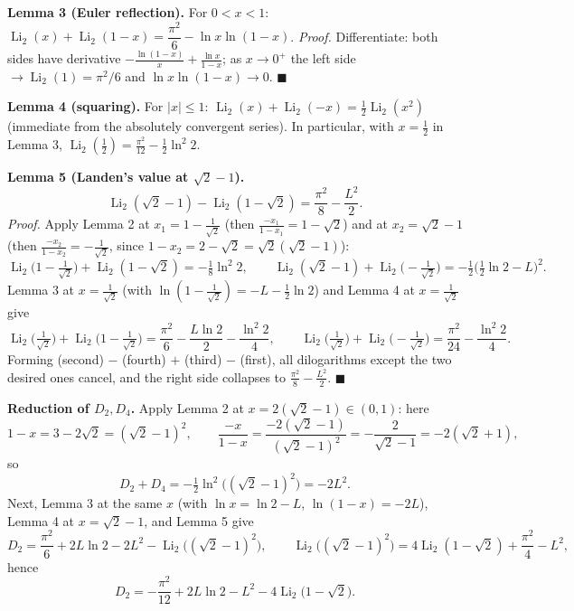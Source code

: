 \documentclass[11pt]{article}
\theoremstyle{remark}
\begin{document}
\textbf{Lemma 3 (Euler reflection).} For $0<x<1$: $\operatorname{Li}_2(x)+\operatorname{Li}_2(1-x)=\dfrac{\pi^2}{6}-\ln x\ln(1-x)$.
\emph{Proof.} Differentiate: both sides have derivative $-\tfrac{\ln(1-x)}{x}+\tfrac{\ln x}{1-x}$; as $x\to0^+$ the left side $\to\operatorname{Li}_2(1)=\pi^2/6$ and $\ln x\ln(1-x)\to0$. $\blacksquare$

\textbf{Lemma 4 (squaring).} For $|x|\le1$: $\operatorname{Li}_2(x)+\operatorname{Li}_2(-x)=\tfrac12\operatorname{Li}_2(x^2)$ (immediate from the absolutely convergent series). In particular, with $x=\tfrac12$ in Lemma 3, $\operatorname{Li}_2(\tfrac12)=\tfrac{\pi^2}{12}-\tfrac12\ln^2 2$.

\textbf{Lemma 5 (Landen's value at $\sqrt2-1$).}
$$\operatorname{Li}_2(\sqrt2-1)-\operatorname{Li}_2(1-\sqrt2)=\frac{\pi^2}{8}-\frac{L^{2}}{2}.$$
\emph{Proof.} Apply Lemma 2 at $x_1=1-\tfrac1{\sqrt2}$ (then $\tfrac{-x_1}{1-x_1}=1-\sqrt2$) and at $x_2=\sqrt2-1$ (then $\tfrac{-x_2}{1-x_2}=-\tfrac1{\sqrt2}$, since $1-x_2=2-\sqrt2=\sqrt2(\sqrt2-1)$):
$$\operatorname{Li}_2\!\big(1-\tfrac1{\sqrt2}\big)+\operatorname{Li}_2(1-\sqrt2)=-\tfrac18\ln^2 2, \qquad
\operatorname{Li}_2(\sqrt2-1)+\operatorname{Li}_2\!\big(-\tfrac1{\sqrt2}\big)=-\tfrac12\big(\tfrac12\ln2-L\big)^2 .$$
Lemma 3 at $x=\tfrac{1}{\sqrt2}$ (with $\ln(1-\tfrac1{\sqrt2})=-L-\tfrac12\ln2$) and Lemma 4 at $x=\tfrac1{\sqrt2}$ give
$$\operatorname{Li}_2\!\big(\tfrac1{\sqrt2}\big)+\operatorname{Li}_2\!\big(1-\tfrac1{\sqrt2}\big)=\frac{\pi^2}{6}-\frac{L\ln2}{2}-\frac{\ln^2 2}{4},\qquad
\operatorname{Li}_2\!\big(\tfrac1{\sqrt2}\big)+\operatorname{Li}_2\!\big(-\tfrac1{\sqrt2}\big)=\frac{\pi^2}{24}-\frac{\ln^2 2}{4}.$$
Forming (second) $-$ (fourth) $+$ (third) $-$ (first), all dilogarithms except the two desired ones cancel, and the right side collapses to $\tfrac{\pi^2}{8}-\tfrac{L^2}{2}$. $\blacksquare$

\textbf{Reduction of $D_2, D_4$.} Apply Lemma 2 at $x=2(\sqrt2-1)\in(0,1)$: here
$$1-x=3-2\sqrt2=(\sqrt2-1)^2,\qquad \frac{-x}{1-x}=\frac{-2(\sqrt2-1)}{(\sqrt2-1)^2}=-\frac{2}{\sqrt2-1}=-2(\sqrt2+1),$$
so
\begin{equation*}D_2+D_4=-\tfrac12\ln^2\!\big((\sqrt2-1)^2\big)=-2L^{2}. \tag{6.1}\end{equation*}
Next, Lemma 3 at the same $x$ (with $\ln x=\ln2-L$, $\ln(1-x)=-2L$), Lemma 4 at $x=\sqrt2-1$, and Lemma 5 give
$$D_2=\frac{\pi^2}{6}+2L\ln2-2L^2-\operatorname{Li}_2\!\big((\sqrt2-1)^2\big),\qquad
\operatorname{Li}_2\!\big((\sqrt2-1)^2\big)=4\operatorname{Li}_2(1-\sqrt2)+\frac{\pi^2}{4}-L^2,$$
hence
\begin{equation*}D_2=-\frac{\pi^{2}}{12}+2L\ln 2-L^{2}-4\operatorname{Li}_2\!\big(1-\sqrt2\big). \tag{6.2}\end{equation*}
\end{document}
